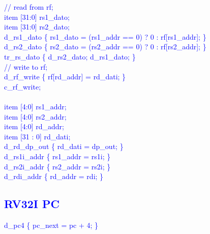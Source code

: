 \textcolor{blue}{
\indent // read from rf; \\%
\indent item [31:0] rs1\_dato;\\%
\indent item [31:0] rs2\_dato;\\%
\indent d\_rs1\_dato \{ rs1\_dato = (rs1\_addr == 0) ? 0 : rf[rs1\_addr]; \} \\%
\indent d\_rs2\_dato \{ rs2\_dato = (rs2\_addr == 0) ? 0 : rf[rs2\_addr]; \} \\%
\indent tr\_rs\_dato \{ d\_rs2\_dato; d\_rs1\_dato; \} \\%
\indent // write to rf; \\%
\indent d\_rf\_write \{ rf[rd\_addr] = rd\_dati; \} \\%
\indent c\_rf\_write; \\%
\\
\indent item [4:0] rs1\_addr;\\%
\indent item [4:0] rs2\_addr;\\%
\indent item [4:0] rd\_addr;\\%
\indent item [31 : 0] rd\_dati;\\%
\indent d\_rd\_dp\_out \{ rd\_dati = dp\_out; \} \\%
\indent d\_rs1i\_addr \{ rs1\_addr = rs1i; \}\\%
\indent d\_rs2i\_addr \{ rs2\_addr = rs2i; \}\\%
\indent d\_rdi\_addr \{ rd\_addr = rdi; \}\\%
}

\subsection{\textcolor{blue}{RV32I PC}}

\textcolor{blue}{
\indent d\_pc4 \{ pc\_next = pc + 4; \} \\%
}

